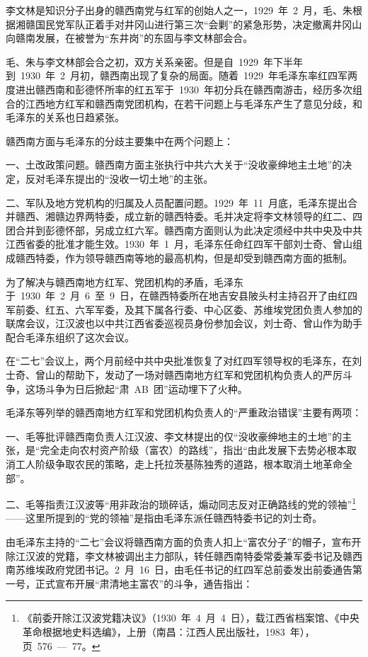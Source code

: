 李文林是知识分子出身的赣西南党与红军的创始人之一，1929~年~2~月，毛、朱根据湘赣国民党军队正着手对井冈山进行第三次“会剿”的紧急形势，决定撤离井冈山向赣南发展，在被誉为“东井岗”的东固与李文林部会合。

毛、朱与李文林部会合之初，双方关系亲密。但是自~1929~年下半年到~1930~年~2~月初，赣西南出现了复杂的局面。随着~1929~年毛泽东率红四军两度进出赣西南和彭德怀所率的红五军于~1930~年初分兵在赣西南游击，经历多次组合的江西地方红军和赣西南党团机构，在若干问题上与毛泽东产生了意见分歧，和毛泽东的关系也日趋紧张。

赣西南方面与毛泽东的分歧主要集中在两个问题上：

一、土改政策问题。赣西南方面主张执行中共六大关于“没收豪绅地主土地”的决定，反对毛泽东提出的“没收一切土地”的主张。

二、军队及地方党机构的归属及人员配置问题。1929~年~11~月底，毛泽东提出合并赣西、湘赣边界两特委，成立新的赣西特委。毛并决定将李文林领导的红二、四团合并到彭德怀部，另成立红六军。赣西南方面则认为此决定须经中共中央及中共江西省委的批准才能生效。1930~年~1~月，毛泽东任命红四军干部刘士奇、曾山组成赣西特委，作为领导赣西南等地的最高机构，但是却受到赣西南方面的抵制。

为了解决与赣西南地方红军、党团机构的矛盾，毛泽东于~1930~年~2~月~6~至~9~日，在赣西特委所在地吉安县陂头村主持召开了由红四军前委、红五、六军军委，及其下属各行委、中心区委、苏维埃党团负责人参加的联席会议，江汉波也以中共江西省委巡视员身份参加会议，刘士奇、曾山作为助手配合毛泽东组织了这次会议。

在“二七”会议上，两个月前经中共中央批准恢复了对红四军领导权的毛泽东，在刘士奇、曾山的帮助下，发动了一场对赣西南地方红军和党团机构负责人的严厉斗争，这场斗争为日后掀起“肃~AB~团”运动埋下了火种。

毛泽东等列举的赣西南地方红军和党团机构负责人的“严重政治错误”主要有两项：

一、毛等批评赣西南负责人江汉波、李文林提出的仅“没收豪绅地主的土地”的主张，是“完全走向农村资产阶级（富农）的路线”，指出“由此发展下去势必根本取消工人阶级争取农民的策略，走上托拉茨基陈独秀的道路，根本取消土地革命全部”。

二、毛等指责江汉波等“用非政治的琐碎话，煽动同志反对正确路线的党的领袖”\footnote{《前委开除江汉波党籍决议》（1930~年~4~月~4~日），载江西省档案馆、《中央革命根据地史料选编》，上册（南昌：江西人民出版社，1983~年），页~576~—~77。}——这里所提到的“党的领袖”是指由毛泽东派任赣西特委书记的刘士奇。

由毛泽东主持的“二七”会议将赣西南方面的负责人扣上“富农分子”的帽子，宣布开除江汉波的党籍，李文林被调出主力部队，转任赣西南特委常委兼军委书记及赣西南苏维埃政府党团书记。2~月~16~日，由毛任书记的红四军总前委发出前委通告第一号，正式宣布开展“肃清地主富农”的斗争，通告指出：

